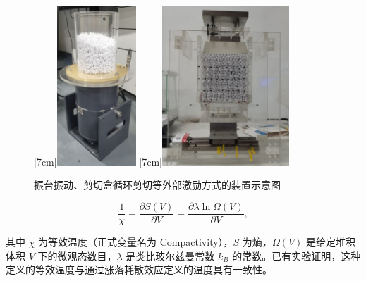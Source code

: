\begin{figure}[!hbtp]
  \centering
                [7cm]{\includegraphics[height=6cm]{figures/1_tapping.jpg}}
  \hspace{1cm}
                [7cm]{\includegraphics[height=6cm]{figures/1_shearing.jpg}}
  \caption{振台振动、剪切盒循环剪切等外部激励方式的装置示意图}
  \label{fig:apparatus_of_granular}
\end{figure}

\begin{equation}
  \frac{1}{\chi} = \frac{\partial S(V)}{\partial V} = \frac{\partial \lambda\ln{\Omega(V)}}{\partial V},
\end{equation}

其中 $\chi$ 为等效温度（正式变量名为 Compactivity），$S$ 为熵，$\Omega(V)$ 是给定堆积体积 $V$ 下的微观态数目，$\lambda$ 是类比玻尔兹曼常数 $k_{B}$ 的常数。已有实验证明，这种定义的等效温度与通过涨落耗散效应定义的温度具有一致性\cite{PhysRevLett.129.228004}。

